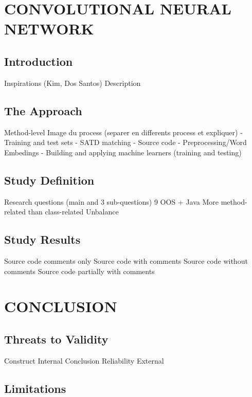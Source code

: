 \documentclass{beamer}
\begin{document}
	\section{CONVOLUTIONAL NEURAL NETWORK}
	
		\subsection{Introduction}
		
		Inspirations (Kim, Dos Santos)
		Description

		\subsection{The Approach}
		
		Method-level
		Image du process (separer en differents process et expliquer)
		- Training and test sets
		- SATD matching
		- Source code
		- Preprocessing/Word Embedings
		- Building and applying machine learners (training and testing)

		\subsection{Study Definition}	
		
		Research questions (main and 3 sub-questions)
		9 OOS + Java
		More method-related than class-related
		Unbalance

		\subsection{Study Results}
		
		Source code comments only
		Source code with comments
		Source code without comments
		Source code partially with comments
			
	\section{CONCLUSION}
	
		\subsection{Threats to Validity}
		
		Construct
		Internal
		Conclusion
		Reliability
		External

		\subsection{Limitations}	
		
\end{document}
